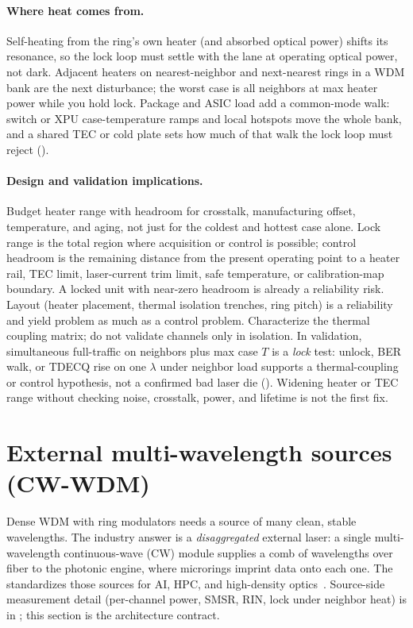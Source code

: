 \paragraph{Where heat comes from.}
Self-heating from the ring's own heater (and absorbed optical power) shifts its
resonance, so the lock loop must settle with the lane at operating optical power,
not dark. Adjacent heaters on nearest-neighbor and next-nearest rings in a WDM
bank are the next disturbance; the worst case is all neighbors at max heater power
while you hold lock. Package and ASIC load add a common-mode walk: switch or XPU
case-temperature ramps and local hotspots move the whole bank, and a shared TEC or
cold plate sets how much of that walk the lock loop must reject
().

\paragraph{Design and validation implications.}
Budget heater range with headroom for crosstalk, manufacturing offset,
temperature, and aging, not just for the coldest and hottest case alone. Lock
range is the total region where acquisition or control is possible; control
headroom is the remaining distance from the present operating point to a heater
rail, TEC limit, laser-current trim limit, safe temperature, or calibration-map
boundary. A locked unit with near-zero headroom is already a reliability risk.
Layout (heater placement, thermal isolation trenches, ring pitch) is a
reliability and yield problem as much as a control problem. Characterize the
thermal coupling matrix; do not validate channels only in isolation. In
validation, simultaneous full-traffic on neighbors plus max case $T$ is a
\emph{lock} test: unlock, BER walk, or TDECQ rise on one $\lambda$ under neighbor
load supports a thermal-coupling or control hypothesis, not a confirmed bad laser
die (). Widening heater
or TEC range without checking noise, crosstalk, power, and lifetime is not the
first fix.

\section{External multi-wavelength sources (CW-WDM)}
\label{sec:cwwdm}

Dense WDM with ring modulators needs a source of many clean, stable wavelengths.
The industry answer is a \emph{disaggregated} external laser: a single
multi-wavelength continuous-wave (CW) module supplies a comb of wavelengths over
fiber to the photonic engine, where microrings imprint data onto each one. The
 standardizes those sources for AI, HPC, and high-density
optics~. Source-side measurement detail (per-channel power, SMSR,
RIN, lock under neighbor heat) is in ; this section is the
architecture contract.

